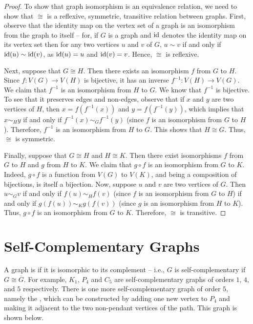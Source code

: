 \begin{proof}
To show that graph isomorphism is an equivalence relation, we need to show that $\cong$ is a reflexive, symmetric, transitive relation between graphs. First, observe that the identity map on the vertex set of a graph is an isomorphism from the graph to itself -- for, if $G$ is a graph and $\mathrm{id}$ denotes the identity map on its vertex set then for any two vertices $u$ and $v$ of $G$, $u \sim v$ if and only if $\mathrm{id}(u) \sim \mathrm{id}(v)$, as $\mathrm{id}(u) = u$ and $\mathrm{id}(v) = v$. Hence, $\cong$ is reflexive.

Next, suppose that $G \cong H$. Then there exists an isomorphism $f$ from $G$ to $H$. Since $f \colon V(G) \to V(H)$ is bijective, it has an inverse $f^{-1} \colon V(H) \to V(G)$. We claim that $f^{-1}$ is an isomorphism from $H$ to $G$. We know that $f^{-1}$ is bijective. To see that it preserves edges and non-edges, observe that if $x$ and $y$ are two vertices of $H$, then $x = f(f^{-1}(x))$ and $y = f(f^{-1}(y))$, which implies that $x \sim_H y$ if and only if $f^{-1}(x) \sim_G f^{-1}(y)$ (since $f$ is an isomorphism from $G$ to $H$). Therefore, $f^{-1}$ is an isomorphism from $H$ to $G$. This shows that $H \cong G$. Thus, $\cong$ is symmetric.

Finally, suppose that $G \cong H$ and $H \cong K$. Then there exist isomorphisms $f$ from $G$ to $H$ and $g$ from $H$ to $K$. We claim that $g \circ f$ is an isomorphism from $G$ to $K$. Indeed, $g \circ f$ is a function from $V(G)$ to $V(K)$, and being a composition of bijections, is itself a bijection. Now, suppose $u$ and $v$ are two vertices of $G$. Then $u \sim_G v$ if and only if $f(u) \sim_H f(v)$ (since $f$ is an isomorphism from $G$ to $H$) if and only if $g(f(u)) \sim_K g(f(v))$ (since $g$ is an isomorphism from $H$ to $K$). Thus, $g \circ f$ is an isomorphism from $G$ to $K$. Therefore, $\cong$ is transitive.
\end{proof}

\section{Self-Complementary Graphs}\label{sec:SC}

A graph is  if it is isomorphic to its complement -- i.e., $G$ is self-complementary if $G \cong \overline G$. For example, $K_1$, $P_4$ and $C_5$ are self-complementary graphs of orders $1$, $4$, and $5$ respectively. There is one more self-complementary graph of order $5$, namely the , which can be constructed by adding one new vertex to $P_4$ and making it adjacent to the two non-pendant vertices of the path. This graph is shown below.

